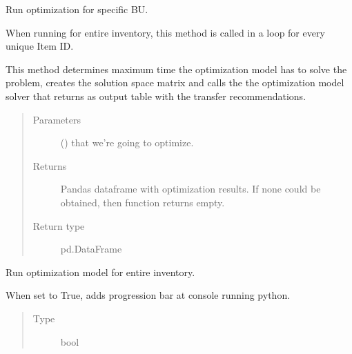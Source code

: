 \documentclass[letterpaper,10pt,english]{sphinxmanual}
\begin{document}
\begin{fulllineitems}
\begin{fulllineitems}
\label{\detokenize{source/optimization.model:optimization.model.main.ModelOptimization.optimize}}
Run optimization for specific BU.

When running for entire inventory, this method is called
in a loop for every unique Item ID.

This method determines maximum time the optimization model has
to solve the problem, creates the solution space matrix and calls the
the optimization model solver that returns as output table with the
transfer recommendations.
\begin{quote}\begin{description}
\item[{Parameters}] \leavevmode
{} () \textendash{}  that we’re going to optimize.

\item[{Returns}] \leavevmode
{} \textendash{} Pandas dataframe with optimization results. If none could be             obtained, then function returns empty.

\item[{Return type}] \leavevmode
pd.DataFrame

\end{description}\end{quote}

\end{fulllineitems}


\begin{fulllineitems}
\label{\detokenize{source/optimization.model:optimization.model.main.ModelOptimization.run_all}}
Run optimization model for entire inventory.

\begin{fulllineitems}
\label{\detokenize{source/optimization.model:optimization.model.main.ModelOptimization.USE_TQDM}}
When set to True, adds progression bar at console running python.
\begin{quote}\begin{description}
\item[{Type}] \leavevmode
bool


\end{description}
\end{quote}
\end{fulllineitems}
\end{fulllineitems}
\end{fulllineitems}
\end{document}
